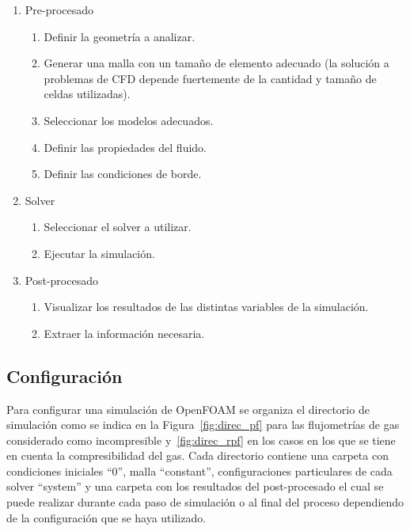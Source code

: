 \begin{enumerate}
    \item Pre-procesado

        \begin{enumerate}
            \item Definir la geometría a analizar.
            \item Generar una malla con un tamaño de elemento adecuado (la
solución a problemas de CFD depende fuertemente de la cantidad y tamaño de
celdas utilizadas).
            \item Seleccionar los modelos adecuados.
            \item Definir las propiedades del fluido.
            \item Definir las condiciones de borde.

        \end{enumerate}
    \item Solver
    \begin{enumerate} \item Seleccionar el solver a utilizar.
            \item Ejecutar la simulación.
    \end{enumerate}
\item Post-procesado
    \begin{enumerate}
        \item Visualizar los resultados de las distintas variables de la
            simulación.
        \item Extraer la información necesaria.
    \end{enumerate}
\end{enumerate}




\subsection{Configuración}
%
Para configurar una simulación de OpenFOAM se organiza el directorio de
simulación como se indica en la Figura~\ref{fig:direc_pf} para las flujometrías
de gas considerado como incompresible  y~\ref{fig:direc_rpf} en los casos en
los que se tiene en cuenta la compresibilidad del gas.
%
Cada directorio contiene una carpeta con condiciones iniciales ``0'', malla
``constant'', configuraciones particulares de cada solver ``system'' y una
carpeta con los resultados del post-procesado el cual se puede realizar
durante cada paso de simulación o al final del proceso dependiendo de la
configuración que se haya utilizado.

